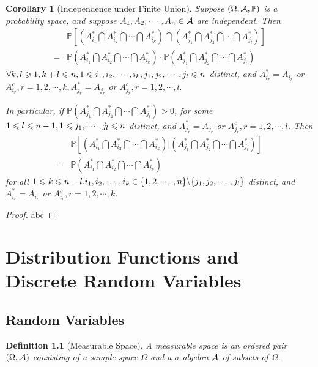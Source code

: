 \documentclass[openany,12pt]{book}
\newtheorem{corollary}{Corollary}[chapter]
\newtheorem{definition}{Definition}[chapter]
\begin{document}
\begin{corollary}[Independence under Finite Union]
  Suppose $(\Omega,\mathcal{A},\mathbb{P})$ is a probability space, and suppose $A_1,A_2, \cdots,A_n\in\mathcal{A}$ are independent. Then
  $$\begin{aligned}
        & \mathbb{P}\left[\left(A_{i_1}^* \bigcap A_{i_2}^*\bigcap\cdots\bigcap A_{i_k}^*\right)\bigcap\left(A_{j_1}^* \bigcap A_{j_2}^*\bigcap\cdots\bigcap A_{j_l}^* \right)\right] \\
      = & \mathbb{P}\left(A_{i_1}^*\bigcap A_{i_2}^*\bigcap\cdots\bigcap A_{i_k}^*\right)\cdot \mathbb{P}\left(A_{j_1}^*\bigcap A_{j_2}^*\bigcap\cdots\bigcap A_{j_l}^*\right)
    \end{aligned}$$
  $\forall k,l\geqslant1, k+l\leqslant n, 1\leqslant i_1,i_2, \cdots,i_k,j_1,j_2, \cdots,j_l\leqslant n$ distinct, and $A_{i_r}^*=A_{i_r}$ or $A_{i_r}^c, r=1,2, \cdots,k, A_{j_r}^*=A_{j_r}$ or $A_{j_r}^c, r=1,2, \cdots,l.$

  In particular, if $\mathbb{P}\left(A_{j_1}^* \bigcap A_{j_2}^* \bigcap\cdots\bigcap A_{j_l}^*\right)>0$, for some $1\leqslant l\leqslant n-1, 1\leqslant j_1, \cdots,j_l\leqslant n$ distinct, and $A_{j_r}^*=A_{j_r}$ or $A_{j_r}^c, r=1,2, \cdots,l$. Then
  $$\begin{aligned}
        & \mathbb{P}\left[\left(A_{i_1}^*\bigcap A_{i_2}^*\bigcap\cdots\bigcap A_{i_k}^*\right)\bigg|\left(A_{j_1}^*\bigcap A_{j_2}^*\bigcap\cdots\bigcap A_{j_l}^*\right)\right] \\
      = & \mathbb{P}\left(A_{i_1}^*\bigcap A_{i_2}^*\bigcap\cdots\bigcap A_{i_k}^*\right)\end{aligned}$$
  for all $1\leqslant k\leqslant n-l. i_1,i_2, \cdots,i_k\in\{1,2, \cdots,n\}\backslash\{j_1,j_2, \cdots,j_l \}$ distinct, and $A_{i_r}^*=A_{i_r }$ or $A_{i_r}^c,  r=1,2, \cdots,k$.
\end{corollary}

\begin{proof}
  abc
\end{proof}

\chapter{Distribution Functions and Discrete Random Variables}

\section{Random Variables}

\begin{definition}[Measurable Space]
  A measurable space is an ordered pair $(\Omega,\mathcal{A})$ consisting of a sample space $\Omega$ and a $\sigma$-algebra $\mathcal{A}$ of subsets of $\Omega$.
\end{definition}
\end{document}
